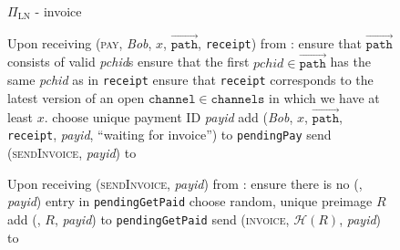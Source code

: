   \begin{figure}[H]
    \begin{protocolbox}{$\Pi_{\mathrm{LN}}$ - invoice}
      \begin{algorithmic}[1]
        \State Upon receiving (\textsc{pay}, \textit{Bob}, $x$,
        $\overrightarrow{\mathtt{path}}$, \texttt{receipt}) from \environment:
        \Indent
          \State ensure that $\overrightarrow{\mathtt{path}}$ consists of valid
          \textit{pchid}s
          \State ensure that the first $\mathit{pchid} \in
          \overrightarrow{\mathtt{path}}$ has the same \textit{pchid} as in
          \texttt{receipt}
          \State ensure that \texttt{receipt} corresponds to the latest version
          of an open $\mathtt{channel} \in \mathtt{channels}$ in which we have
          at least $x$.
          \State choose unique payment ID \textit{payid} 
          \State add (\textit{Bob}, $x$, $\overrightarrow{\mathtt{path}}$,
          \texttt{receipt}, \textit{payid}, ``waiting for invoice'') to
          \texttt{pendingPay}
          \State send (\textsc{sendInvoice}, \textit{payid}) to \bob{}
        \EndIndent
        \Statex

        \State Upon receiving (\textsc{sendInvoice}, \textit{payid}) from \bob:
        \Indent
          \State ensure there is no (\bob, \textit{payid}) entry in
          \texttt{pendingGetPaid}
          \State choose random, unique preimage $R$
          \State add (\bob, $R$, \textit{payid}) to \texttt{pendingGetPaid}
          \State send (\textsc{invoice}, $\mathcal{H}\left(R\right)$,
          \textit{payid}) to \bob{}
        \EndIndent
        \Statex


\end{algorithmic}
\end{protocolbox}
\end{figure}
